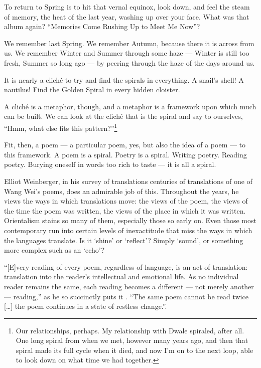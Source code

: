 \documentclass[12pt,oneside]{memoir}
\begin{document}
To return to Spring is to hit that vernal equinox, look down, and feel the steam of memory, the heat of the last year, washing up over your face. What was that album again? ``Memories Come Rushing Up to Meet Me Now''?

We remember last Spring. We remember Autumn, because there it is across from us. We remember Winter and Summer through some haze --- Winter is still too fresh, Summer so long ago --- by peering through the haze of the days around us.

It is nearly a cliché to try and find the spirals in everything. A snail's shell! A nautilus! Find the Golden Spiral in every hidden cloister.

A cliché is a metaphor, though, and a metaphor is a framework upon which much can be built. We can look at the cliché that is the spiral and say to ourselves, ``Hmm, what else fits this pattern?''\footnote{Our relationships, perhaps. My relationship with Dwale spiraled, after all. One long spiral from when we met, however many years ago, and then that spiral made its full cycle when it died, and now I'm on to the next loop, able to look down on what time we had together.}

Fit, then, a poem --- a particular poem, yes, but also the idea of a poem --- to this framework. A poem is a spiral. Poetry is a spiral. Writing poetry. Reading poetry. Burying oneself in words too rich to taste --- it is all a spiral.

Elliot Weinberger, in his survey of translations centuries of translations of one of Wang Wei's poems, does an admirable job of this. Throughout the years, he views the ways in which translations move: the views of the poem, the views of the time the poem was written, the views of the place in which it was written. Orientalism stains so many of them, especially those so early on. Even those most contemporary run into certain levels of inexactitude that miss the ways in which the languages translate. Is it `shine' or `reflect'? Simply `sound', or something more complex such as an `echo'?

``{[E]}very reading of every poem, regardless of language, is an act of translation: translation into the reader's intellectual and emotional life. As no individual reader remains the same, each reading becomes a different --- not merely another --- reading,'' as he so succinctly puts it \parencite[46]{wangwei}. ``The same poem cannot be read twice {[\ldots]} the poem continues in a state of restless change.''. 
\end{document}

